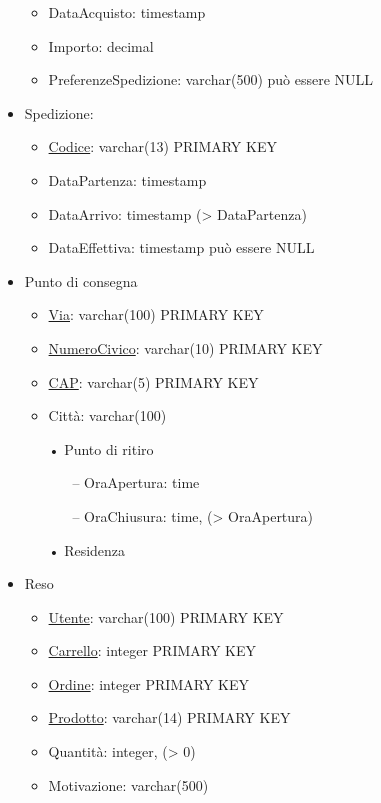 \documentclass[11pt]{article}
\begin{document}
\begin{itemize}
\begin{itemize}
        \item DataAcquisto: timestamp
        \item Importo: decimal
        \item PreferenzeSpedizione: varchar(500) può essere NULL
    \end{itemize}
    \item Spedizione:
    \begin{itemize}
        \item \underline{Codice}: varchar(13) PRIMARY KEY
        \item DataPartenza: timestamp
        \item DataArrivo: timestamp (\textgreater{} DataPartenza)
        \item DataEffettiva: timestamp può essere NULL
    \end{itemize}
    \item Punto di consegna
    \begin{itemize}
        \item \underline{Via}: varchar(100) PRIMARY KEY
        \item \underline{NumeroCivico}: varchar(10) PRIMARY KEY
        \item \underline{CAP}: varchar(5) PRIMARY KEY
        \item Città: varchar(100)
        \item[•] Punto di ritiro
        \begin{itemize}
            \item[–] OraApertura: time
            \item[–] OraChiusura: time, (\textgreater{} OraApertura)
        \end{itemize}
        \item[•] Residenza
    \end{itemize}
    \item Reso
    \begin{itemize}
        \item \underline{Utente}: varchar(100) PRIMARY KEY
        \item \underline{Carrello}: integer PRIMARY KEY
        \item \underline{Ordine}: integer PRIMARY KEY
        \item \underline{Prodotto}: varchar(14) PRIMARY KEY
        \item Quantità: integer, (\textgreater{} 0)
        \item Motivazione: varchar(500)
    \end{itemize}
\end{itemize}
\end{document}
